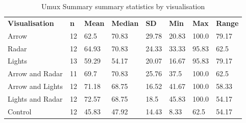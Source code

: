 \begin{table}[]
\caption{Umux Summary summary statistics by visualisation}
\label{tab:UMUX_Summary}
\begin{tabular}{llllllll}
\textbf{Visualisation} & \textbf{n} & \textbf{Mean} & \textbf{Median} & \textbf{SD} & \textbf{Min} & \textbf{Max} & \textbf{Range} \\
Arrow                  & 12         & 62.5          & 70.83           & 29.78       & 20.83        & 100.0        & 79.17 \\
Radar                  & 12         & 64.93         & 70.83           & 24.33       & 33.33        & 95.83        & 62.5 \\
Lights                 & 13         & 59.29         & 54.17           & 20.07       & 16.67        & 95.83        & 79.17 \\
Arrow and Radar        & 11         & 69.7          & 70.83           & 25.76       & 37.5         & 100.0        & 62.5 \\
Arrow and Lights       & 12         & 71.18         & 68.75           & 16.52       & 41.67        & 100.0        & 58.33 \\
Lights and Radar       & 12         & 72.57         & 68.75           & 18.5        & 45.83        & 100.0        & 54.17 \\
Control                & 12         & 45.83         & 47.92           & 14.43       & 8.33         & 62.5         & 54.17
\end{tabular}
\end{table}
